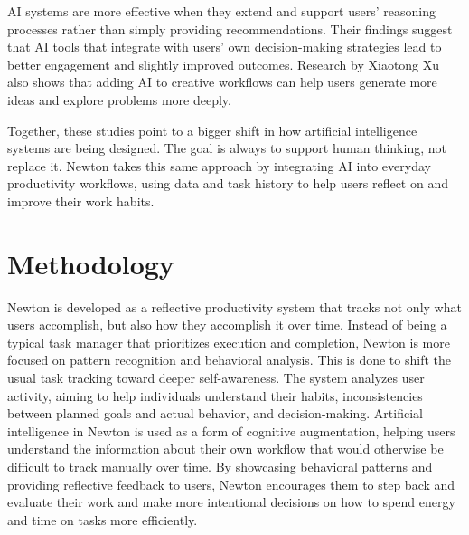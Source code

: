 \documentclass[12pt]{article}
\begin{document}
AI systems are more effective when they extend and support users' reasoning processes rather than simply providing recommendations.
 Their findings suggest that AI tools that integrate with users' own decision-making strategies lead to better engagement and 
 slightly improved outcomes. Research by Xiaotong Xu \cite{10.1145/3706598.3713649} also shows that adding AI to creative 
 workflows can help users generate more ideas and explore problems more deeply.

Together, these studies point to a bigger shift in how artificial intelligence systems are being designed. The goal is always
 to support human thinking, not replace it. Newton takes this same approach by integrating AI into everyday productivity workflows,
  using data and task history to help users reflect on and improve their work habits.





\section{Methodology}
Newton is developed as a reflective productivity system that tracks not only what users accomplish, but also how they accomplish 
it over time. Instead of being a typical task manager that prioritizes execution and completion, Newton is more focused on pattern 
recognition and behavioral analysis. This is done to shift the usual task tracking toward deeper self-awareness. The system analyzes
 user activity, aiming to help individuals understand their habits, inconsistencies between planned goals and actual behavior, and
  decision-making. 
  Artificial intelligence in Newton is used as a form of cognitive augmentation, helping users understand the information about 
  their own workflow that would otherwise be difficult to track manually over time. By showcasing behavioral patterns and providing 
  reflective feedback to users, Newton encourages them to step back and evaluate their work and make more intentional decisions on 
  how to spend energy and time on tasks more efficiently.
\end{document}
